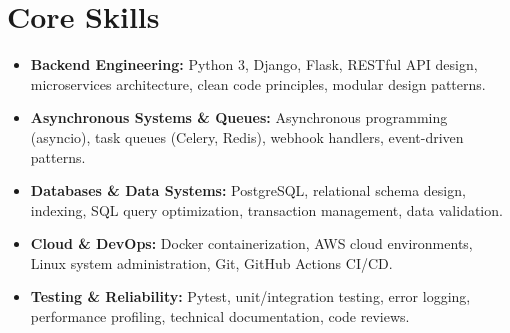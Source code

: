 \documentclass[a4paper,10pt]{article}
\begin{document}
\section{Core Skills}
\begin{itemize}
 \item \textbf{Backend Engineering:} Python 3, Django, Flask, RESTful API design, microservices architecture, clean code principles, modular design patterns.
 \item \textbf{Asynchronous Systems \& Queues:} Asynchronous programming (asyncio), task queues (Celery, Redis), webhook handlers, event-driven patterns.
 \item \textbf{Databases \& Data Systems:} PostgreSQL, relational schema design, indexing, SQL query optimization, transaction management, data validation.
 \item \textbf{Cloud \& DevOps:} Docker containerization, AWS cloud environments, Linux system administration, Git, GitHub Actions CI/CD.
 \item \textbf{Testing \& Reliability:} Pytest, unit/integration testing, error logging, performance profiling, technical documentation, code reviews.
\end{itemize}
\end{document}
